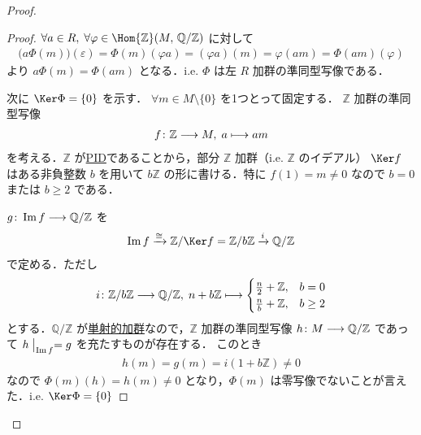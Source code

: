 \documentclass[algtopo_main]{subfiles}
\begin{document}
\begin{proof}
    \begin{proof}
        $\forall a \in R,\; \forall \varphi \in \Hom{\mathbb{Z}}(M,\, \mathbb{Q}/\mathbb{Z})$ に対して 
        \begin{align}
            \bigl( a \Phi (m) \bigr) (\varepsilon) = \Phi(m)(\varphi a) = (\varphi a)(m) = \varphi (am) = \Phi(am) (\varphi)
        \end{align}
        より $a\Phi(m) = \Phi (am)$ となる．i.e. $\Phi$ は左 $R$ 加群の準同型写像である．

        次に $\Ker\Phi = \{0\}$ を示す．  
        $\forall m \in M \setminus \{0\}$ を1つとって固定する．
        $\mathbb{Z}$ 加群の準同型写像
        \begin{align}
            f \colon \mathbb{Z} \longrightarrow M,\; a \longmapsto am
        \end{align}
        を考える．$\mathbb{Z}$ が\hyperref[def:PID]{PID}であることから，部分 $\mathbb{Z}$ 加群（i.e. $\mathbb{Z}$ のイデアル） $\Ker f$ はある非負整数 $b$ を用いて $b \mathbb{Z}$ の形に書ける．特に $f(1) = m \neq 0$ なので $b = 0$ または $b \ge 2$ である．
        
        $g \colon \Im f \longrightarrow \mathbb{Q}/\mathbb{Z}$ を
        \begin{align}
            \Im f \xrightarrow{\cong} \mathbb{Z}/\Ker f = \mathbb{Z}/ b\mathbb{Z} \xrightarrow{i} \mathbb{Q}/\mathbb{Z}
        \end{align}
        で定める．ただし
        \begin{align}
            i \colon \mathbb{Z}/ b \mathbb{Z} \longrightarrow \mathbb{Q}/\mathbb{Z},\; n + b \mathbb{Z} \longmapsto
            \begin{cases}
                \frac{n}{2} + \mathbb{Z}, & b = 0 \\
                \frac{n}{b} + \mathbb{Z}, & b \ge 2
            \end{cases}
        \end{align}
        とする．$\mathbb{Q}/\mathbb{Z}$ が\hyperref[def:inj-mod]{単射的加群}なので，$\mathbb{Z}$ 加群の準同型写像 $h \colon M \longrightarrow \mathbb{Q}/\mathbb{Z}$ であって $h \bigm|_{\Im f} = g$ を充たすものが存在する．
        このとき
        \begin{align}
            h(m) = g(m) = i(1 + b \mathbb{Z}) \neq 0
        \end{align}
        なので $\Phi(m)(h) = h(m) \neq 0$ となり，$\Phi(m)$ は零写像でないことが言えた．i.e. $\Ker \Phi = \{0\}$ 
    \end{proof}
    

\end{proof}
\end{document}
